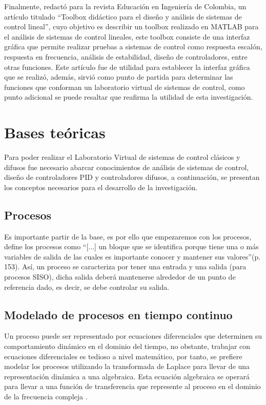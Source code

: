    Finalmente, \textcite{cadavid2009toolbox} redactó para la revista Educación en Ingeniería de Colombia, un artículo titulado \enquote{Toolbox didáctico para el diseño y análisis de sistemas de control lineal}, cuyo objetivo es describir un toolbox realizado en MATLAB para el análisis de sistemas de control lineales, este toolbox consiste de una interfaz gráfica que permite realizar pruebas a sistemas de control como respuesta escalón, respuesta en frecuencia, análisis de estabilidad, diseño de controladores, entre otras funciones. Este artículo fue de utilidad para establecer la interfaz gráfica que se realizó, además, sirvió como punto de partida para determinar las funciones que conforman un laboratorio virtual de sistemas de control, como punto adicional se puede resaltar que reafirma la utilidad de esta investigación.

\section{Bases teóricas}
	
    Para poder realizar el Laboratorio Virtual de sistemas de control clásicos y difusos fue necesario abarcar conocimientos de análisis de sistemas de control, diseño de controladores PID y controladores difusos, a continuación, se presentan los conceptos necesarios para el desarrollo de la investigación.
    
    \subsection{Procesos}
		
        Es importante partir de la base, es por ello que empezaremos con los procesos, \textcite{sanchez2003control} define los procesos como \enquote{[...] un bloque que se identifica porque tiene una o más variables de salida de las cuales es importante conocer y mantener sus valores}(p.$\,$153). Así, un proceso se caracteriza por tener una entrada y una salida (para procesos SISO), dicha salida deberá mantenerse alrededor de un punto de referencia dado, es decir, se debe controlar su salida.
	
	\subsection{Modelado de procesos en tiempo continuo}
	
		Un proceso puede ser representado por ecuaciones diferenciales que determinen su comportamiento dinámico en el dominio del tiempo, no obstante, trabajar con ecuaciones diferenciales es tedioso a nivel matemático, por tanto, se prefiere modelar los procesos utilizando la transformada de Laplace para llevar de una representación dinámica a una algebraica. Esta ecuación algebraica se operará para llevar a una función de transferencia que represente al proceso en el dominio de la frecuencia compleja \Parencite{smith1985principles}.
	

